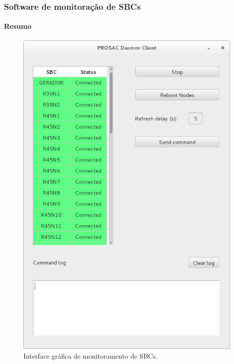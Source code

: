 \begin{frame}
\frametitle{Software de monitoração de SBCs}
\framesubtitle{Resumo}

\begin{figure}[h]

    \centering
    \includegraphics[height=0.7\textheight]{image/sbc}
    \caption {Interface gráfica de monitoramento de SBCs.}
    \label{fig:sbcs}
\end{figure}

\end{frame}